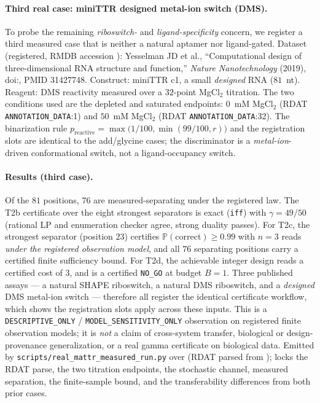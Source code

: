 \documentclass[11pt]{article}
\begin{document}
\paragraph{Third real case: miniTTR designed metal-ion switch (DMS).}
To probe the remaining \emph{riboswitch-} and \emph{ligand-specificity} concern, we register a third
measured case that is neither a natural aptamer nor ligand-gated. Dataset (registered, RMDB accession
\texttt{}): Yesselman JD et al., ``Computational design of three-dimensional
RNA structure and function,'' \emph{Nature Nanotechnology} (2019), doi:\texttt{},
PMID 31427748. Construct: miniTTR c1, a small \emph{designed} RNA ($81$~nt). Reagent: DMS reactivity
measured over a $32$-point MgCl$_{2}$ titration. The two conditions used are the depleted and saturated
endpoints: $0$~mM MgCl$_{2}$ (RDAT \texttt{ANNOTATION\_DATA}:1) and $50$~mM MgCl$_{2}$ (RDAT
\texttt{ANNOTATION\_DATA}:32). The binarization rule
$p_{\mathrm{reactive}}=\max\!\bigl(1/100,\allowbreak \min(99/100,r)\bigr)$
and the registration slots are identical to the add/glycine cases; the discriminator is a
\emph{metal-ion}-driven conformational switch, not a ligand-occupancy switch.

\paragraph{Results (third case).}
Of the $81$ positions, $76$ are measured-separating under the registered law. The T2b certificate over
the eight strongest separators is exact (\texttt{iff}) with $\gamma=49/50$ (rational LP and enumeration
checker agree, strong duality passes). For T2c, the strongest separator (position $23$) certifies
$\mathbb{P}(\mathrm{correct})\ge0.99$ with $n=3$ reads \emph{under the registered observation model},
and all $76$ separating positions carry a certified finite sufficiency bound. For T2d, the achievable
integer design reads a certified cost of $3$, and is a certified \texttt{NO\_GO} at budget $B=1$. Three
published assays --- a natural SHAPE riboswitch, a natural DMS riboswitch, and a \emph{designed} DMS
metal-ion switch --- therefore all register the identical certificate workflow, which shows the
registration slots apply across these inputs. This is a \texttt{DESCRIPTIVE\_ONLY} /
\texttt{MODEL\_SENSITIVITY\_ONLY} observation on registered finite observation models; it is \emph{not} a
claim of cross-system transfer, biological or design-provenance generalization, or a real gamma
certificate on biological data. Emitted by
\texttt{scripts/real\_mattr\_measured\_run.py} over
\texttt{}
(RDAT parsed from \texttt{});
\texttt{} locks the RDAT parse, the two titration endpoints,
the stochastic channel, measured separation, the finite-sample bound, and the transferability
differences from both prior cases.
\end{document}
